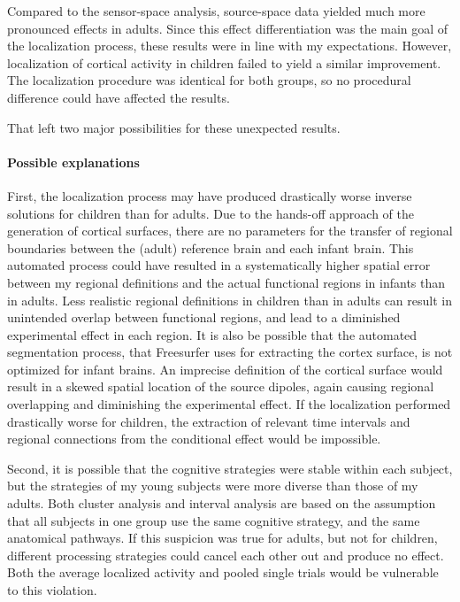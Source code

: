 Compared to the sensor-space analysis, source-space data yielded much more pronounced effects in adults.
Since this effect differentiation was the main goal of the localization process, these results were in line with my expectations.
However, localization of cortical activity in children failed to yield a similar improvement.
The localization procedure was identical for both groups, so no procedural difference could have affected the results.

That left two major possibilities for these unexpected results.

\paragraph{Possible explanations}
First, the localization process may have produced drastically worse inverse solutions for children than for adults.
Due to the hands-off approach of the generation of cortical surfaces, there are no parameters for the transfer of regional boundaries between the (adult) reference brain and each infant brain.
This automated process could have resulted in a systematically higher spatial error between my regional definitions and the actual functional regions in infants than in adults.
Less realistic regional definitions in children than in adults can result in unintended overlap between functional regions, and lead to a diminished experimental effect in each region.
It is also be possible that the automated segmentation process, that Freesurfer uses for extracting the cortex surface, is not optimized for infant brains.
An imprecise definition of the cortical surface would result in a skewed spatial location of the source dipoles, again causing regional overlapping and diminishing the experimental effect.
If the localization performed drastically worse for children, the extraction of relevant time intervals and regional connections from the conditional effect would be impossible.

Second, it is possible that the cognitive strategies were stable within each subject, but the strategies of my young subjects were more diverse than those of my adults.
Both cluster analysis and interval analysis are based on the assumption that all subjects in one group use the same cognitive strategy, and the same anatomical pathways.
If this suspicion was true for adults, but not for children, different processing strategies could cancel each other out and produce no effect.
Both the average localized activity and pooled single trials would be vulnerable to this violation.

